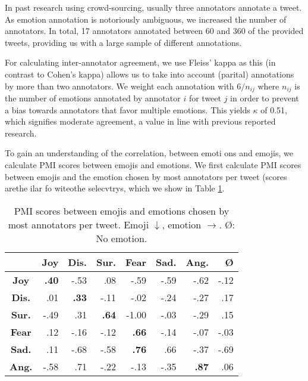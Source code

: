 \documentclass[10pt, a4paper]{article}
\begin{document}
In past research using crowd-sourcing, usually three annotators annotate a tweet. As emotion annotation is notoriously ambiguous, we increased the number of annotators. In total, 17 annotators annotated between 60 and 360 of the provided tweets, providing us with a large sample of different annotations.

For calculating inter-annotator agreement, we use Fleiss' kappa as this (in contrast to Cohen's kappa) allows us to take into account (parital) annotations by more than two annotators. We weight each annotation with $ 6 / n_{ij}$ where $n_{ij}$ is the number of emotions annotated by annotator $i$ for tweet $j$ in order to prevent a bias towards annotators that favor multiple emotions. This yields $\kappa$ of 0.51, which signifies moderate agreement, a value in line with previous reported research.

To gain an understanding of the correlation, between emoti%
%
%
ons and emojis, we calculate PMI scores between emojis and emotions. We first calculate PMI scores between emojis and the emotion chosen by most annotators per tweet (scores arethe ilar fo witeothe selecvtrys, which we show in Table \ref{tab:pmi_results_top_emotions}.

\begin{table}[!ht]
\centering
\begin{tabular}{c | r | r | r | r%
%
%
 | r | r | r}
 & \textbf{Joy} & \textbf{Dis.} & \textbf{Sur.} & \textbf{Fear} & \textbf{Sad.} & \textbf{Ang.} & \textbf{\O} \\\hline
\textbf{Joy} & \textbf{.40} & -.53 & .08 & -.59 & -.59 & -.62 & -.12 \\
\textbf{Dis.} & .01 & \textbf{.33} & -.11 & -.02 & -.24 & -.27 & .17 \\
\textbf{Sur.} & -.49 & .31 & \textbf{.64} & -1.00 & -.03 & -.29 & .15 \\
\textbf{Fear} & .12 & -.16 & -.12 & \textbf{.66} & -.14 & -.07 & -.03 \\
\textbf{Sad.} & .11 & -.68 & -.58 & \textbf{.76} & .66 & -.37 & -.69 \\
\textbf{Ang.} & -.58 & .71 & -.22 & -.13 & -.35 & \textbf{.87} & .06
\end{tabular}
\caption{PMI scores between emojis and emotions chosen by most annotators per tweet. Emoji $\downarrow$, emotion $\rightarrow$. \O: No emotion.}
\label{tab:pmi_results_top_emotions}
\end{table}
\end{document}
